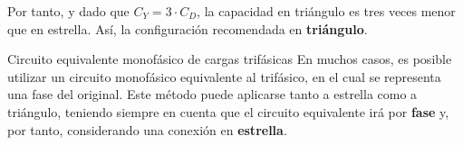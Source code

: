 \documentclass[11pt]{book} %
\makeatletter
\numberwithin{dummy}{section}
\theoremstyle{ocrenumbox}
\theoremstyle{blacknumex}
\theoremstyle{blacknumbox}
\theoremstyle{ocrenum}
\renewcommand{\section}{\@startsection{section}{1}{\z@}
{-4ex \@plus -1ex \@minus -.4ex}
{1ex \@plus.2ex }
{\normalfont\large\sffamily\bfseries}}
\newlength\esp
\makeatother
\begin{document}
		Por tanto, y dado que $C_Y = 3 \cdot C_D$, la capacidad en triángulo es tres veces menor que en estrella. Así, la configuración recomendada en \textbf{triángulo}.
		
		
		
		\section{Circuito equivalente monofásico de cargas trifásicas}\label{sec.c_eq_mon}
	 En muchos casos, es posible utilizar un circuito monofásico equivalente al trifásico, en el cual se representa una fase del original. Este método puede aplicarse tanto a estrella como a triángulo, teniendo siempre en cuenta que el circuito equivalente irá por \textbf{fase} y, por tanto, considerando una conexión en \textbf{estrella}. 
	
	
	
\end{document}
